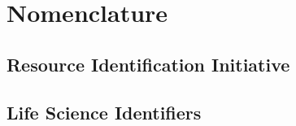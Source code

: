 \documentclass[utf8]{frontiersSCNS} %
\begin{document}


\section*{Nomenclature}

\subsection*{Resource Identification Initiative}

\subsection*{Life Science Identifiers}
\end{document}
